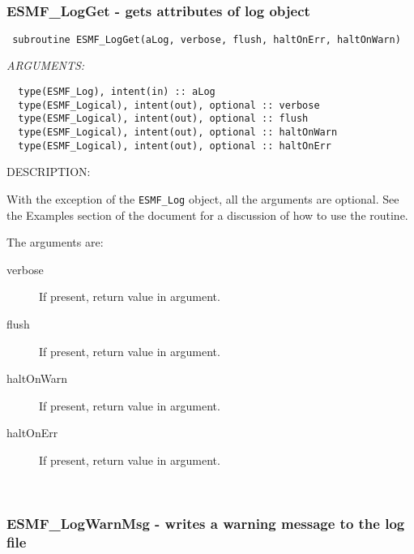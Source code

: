  
\mbox{}\hrulefill\ 
 
\subsubsection [ESMF\_LogGet] {ESMF\_LogGet - gets attributes of log object }


  
\begin{verbatim} subroutine ESMF_LogGet(aLog, verbose, flush, haltOnErr, haltOnWarn)\end{verbatim}{\em ARGUMENTS:}
\begin{verbatim}  type(ESMF_Log), intent(in) :: aLog
  type(ESMF_Logical), intent(out), optional :: verbose
  type(ESMF_Logical), intent(out), optional :: flush 
  type(ESMF_Logical), intent(out), optional :: haltOnWarn 
  type(ESMF_Logical), intent(out), optional :: haltOnErr\end{verbatim}
{\sf DESCRIPTION:\\ }


  
     With the exception of the {\tt ESMF\_Log} object, all the arguments
     are optional.
     See the Examples section of the document for a discussion of how to use the
     routine.
    
     The arguments are:
     \begin{description}
  
     \item[verbose]
     If present, return value in argument. 
    \item[flush]
     If present, return value in argument. 
    \item[haltOnWarn]
     If present, return value in argument. 
    \item[haltOnErr]
     If present, return value in argument. 
  
    \end{description}
  
   
 
\mbox{}\hrulefill\ 
 

  \subsubsection [ESMF\_LogWarnMsg] {ESMF\_LogWarnMsg - writes a warning message to the log file}


